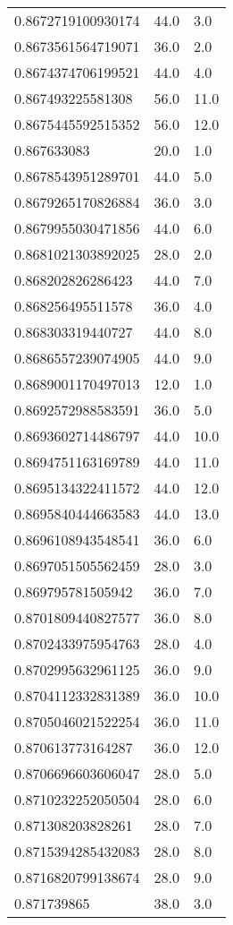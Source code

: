 \begin{center}
\begin{supertabular}[H]{p{0.30\textwidth}p{0.05\textwidth}p{0.05\textwidth}}
0.8672719100930174 & 44.0 & 3.0 \\ 
0.8673561564719071 & 36.0 & 2.0 \\ 
0.8674374706199521 & 44.0 & 4.0 \\ 
0.867493225581308 & 56.0 & 11.0 \\ 
0.8675445592515352 & 56.0 & 12.0 \\ 
0.867633083 & 20.0 & 1.0 \\ 
0.8678543951289701 & 44.0 & 5.0 \\ 
0.8679265170826884 & 36.0 & 3.0 \\ 
0.8679955030471856 & 44.0 & 6.0 \\ 
0.8681021303892025 & 28.0 & 2.0 \\ 
0.868202826286423 & 44.0 & 7.0 \\ 
0.868256495511578 & 36.0 & 4.0 \\ 
0.868303319440727 & 44.0 & 8.0 \\ 
0.8686557239074905 & 44.0 & 9.0 \\ 
0.8689001170497013 & 12.0 & 1.0 \\ 
0.8692572988583591 & 36.0 & 5.0 \\ 
0.8693602714486797 & 44.0 & 10.0 \\ 
0.8694751163169789 & 44.0 & 11.0 \\ 
0.8695134322411572 & 44.0 & 12.0 \\ 
0.8695840444663583 & 44.0 & 13.0 \\ 
0.8696108943548541 & 36.0 & 6.0 \\ 
0.8697051505562459 & 28.0 & 3.0 \\ 
0.869795781505942 & 36.0 & 7.0 \\ 
0.8701809440827577 & 36.0 & 8.0 \\ 
0.8702433975954763 & 28.0 & 4.0 \\ 
0.8702995632961125 & 36.0 & 9.0 \\ 
0.8704112332831389 & 36.0 & 10.0 \\ 
0.8705046021522254 & 36.0 & 11.0 \\ 
0.870613773164287 & 36.0 & 12.0 \\ 
0.8706696603606047 & 28.0 & 5.0 \\ 
0.8710232252050504 & 28.0 & 6.0 \\ 
0.871308203828261 & 28.0 & 7.0 \\ 
0.8715394285432083 & 28.0 & 8.0 \\ 
0.8716820799138674 & 28.0 & 9.0 \\ 
0.871739865 & 38.0 & 3.0 \\ 

\end{supertabular}
\end{center}

